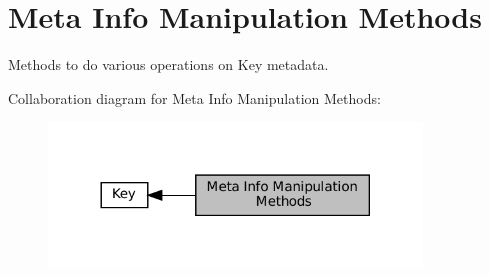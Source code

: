 \hypertarget{group__keymeta}{}\section{Meta Info Manipulation Methods}
\label{group__keymeta}


Methods to do various operations on Key metadata.  


Collaboration diagram for Meta Info Manipulation Methods\+:
\nopagebreak
\begin{figure}[H]
\begin{center}
\leavevmode
\includegraphics[width=281pt]{group__keymeta}
\end{center}
\end{figure}
